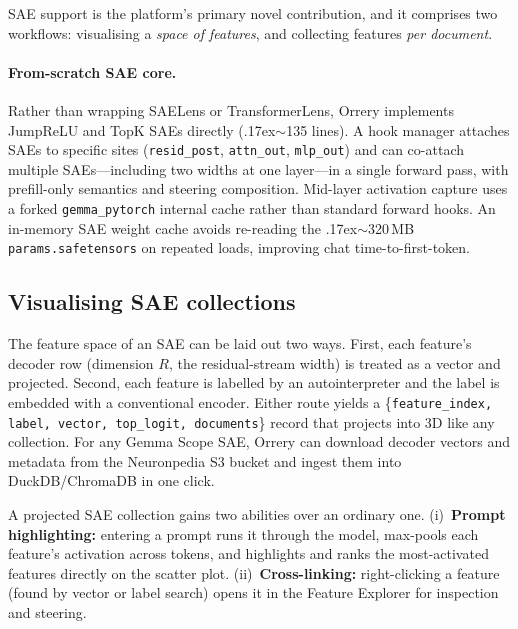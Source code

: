 \documentclass[11pt]{article}
\begin{document}
SAE support is the platform's primary novel contribution, and it comprises
two workflows: visualising a \emph{space of features}, and collecting
features \emph{per document}.

\paragraph{From-scratch SAE core.} Rather than wrapping SAELens or
TransformerLens, Orrery implements JumpReLU and TopK SAEs directly
(\raise.17ex\hbox{$\scriptstyle\sim$}135 lines). A hook manager attaches
SAEs to specific sites (\texttt{resid\_post}, \texttt{attn\_out},
\texttt{mlp\_out}) and can co-attach multiple SAEs---including two widths at
one layer---in a single forward pass, with prefill-only semantics and
steering composition. Mid-layer activation capture uses a forked
\texttt{gemma\_pytorch} internal cache rather than standard forward hooks.
An in-memory SAE weight cache avoids re-reading the
\raise.17ex\hbox{$\scriptstyle\sim$}320\,MB \texttt{params.safetensors} on
repeated loads, improving chat time-to-first-token.

\subsection{Visualising SAE collections}
The feature space of an SAE can be laid out two ways. First, each feature's
decoder row (dimension $R$, the residual-stream width) is treated as a
vector and projected. Second, each feature is labelled by an
autointerpreter and the label is embedded with a conventional encoder.
Either route yields a \{\texttt{feature\_index, label, vector, top\_logit,
documents}\} record that projects into 3D like any collection. For any
Gemma Scope SAE, Orrery can download decoder vectors and metadata from the
Neuronpedia S3 bucket and ingest them into DuckDB/ChromaDB in one click.

A projected SAE collection gains two abilities over an ordinary one.
(i)~\textbf{Prompt highlighting:} entering a prompt runs it through the
model, max-pools each feature's activation across tokens, and highlights
and ranks the most-activated features directly on the scatter plot.
(ii)~\textbf{Cross-linking:} right-clicking a feature (found by vector or
label search) opens it in the Feature Explorer for inspection and steering.
\end{document}
